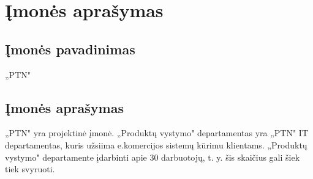 \section{Įmonės aprašymas}

\subsection{Įmonės pavadinimas}
„PTN"



\subsection{Įmonės aprašymas}


„PTN" yra projektinė įmonė. „Produktų vystymo" departamentas yra „PTN" IT departamentas, kuris užsiima e.komercijos sistemų kūrimu klientams. „Produktų vystymo" departamente įdarbinti apie 30 darbuotojų, t. y. šis skaičius gali šiek tiek svyruoti.


